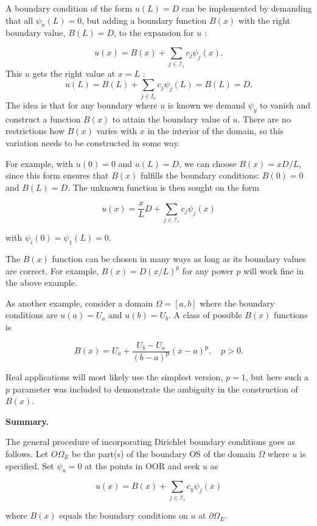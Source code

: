 \documentclass[../main.tex]{subfiles}
\begin{document}
	A boundary condition of the form $u(L)=D$ can be implemented by demanding that all $\psi_{n}(L)=0$, but adding a boundary function $B(x)$ with the right boundary value, $B(L)=D$, to the expansion for $u$ :
	
	$$
	u(x)=B(x)+\sum_{j \in \mathcal{I}_{s}} c_{j} \psi_{j}(x) .
	$$
	This $u$ gets the right value at $x=L$ :
	$$
	u(L)=B(L)+\sum_{j \in I_{a}} c_{j} \psi_{j}(L)=B(L)=D .
	$$
	The idea is that for any boundary where $u$ is known we demand $\psi_{y}$ to vanish and construct a function $B(x)$ to attain the boundary value of $u$. There are no restrictions how $B(x)$ varies with $x$ in the interior of the domain, so this variation needs to be constructed in some way.
	
	For example, with $u(0)=0$ and $u(L)=D$, we can choose $B(x)=x D / L$, since this form ensures that $B(x)$ fulfills the boundary conditions: $B(0)=0$ and $B(L)=D$. The unknown function is then sought on the form
	
	\begin{equation}
	\label{eqa163}
		u(x)=\frac{x}{L} D+\sum_{j \in \mathcal{I}_{*}} c_{j} \psi_{j}(x)
	\end{equation}

	\noindent with $\psi_{i}(0)=\psi_{1}(L)=0$. 
	
	The $B(x)$ function can be chosen in many ways as long as its boundary values are correct. For example, $B(x)=D(x / L)^{p}$ for any power $p$ will work fine in the above example.
	
	As another example, consider a domain $\Omega=[a, b]$ where the boundary conditions are $u(a)=U_{a}$ and $u(b)=U_{b}$. A class of possible $B(x)$ functions is
	
	\begin{equation}
	\label{eqa164}
		B(x)=U_{a}+\frac{U_{b}-U_{a}}{(b-a)^{\mathrm{p}}}(x-a)^{\mathrm{p}}, \quad p>0 .
	\end{equation}

	\noindent Real applications will most likely use the simplest version, $p=1$, but here such a $p$ parameter was included to demonstrate the ambiguity in the construction of $B(x)$.
	
	\begin{mybox}
		\textbf{Summary.}
		
		\noindent The general procedure of incorporating Dirichlet boundary conditions goes as follows. Let $O \Omega_{E}$ be the part(s) of the boundary OS of the domain $\Omega$ where $u$ is specified. Set $\psi_{u}=0$ at the points in OOR and seek $u$ as
		
		\begin{equation}
		\label{eqa165}
			u(x)=B(x)+\sum_{j \in \mathcal{I}_{s}} c_{y} \psi_{j}(x)
		\end{equation}
			
		where $B(x)$ equals the boundary conditions on $u$ at $\partial \Omega_{E}$.
	\end{mybox}
	
\end{document}
